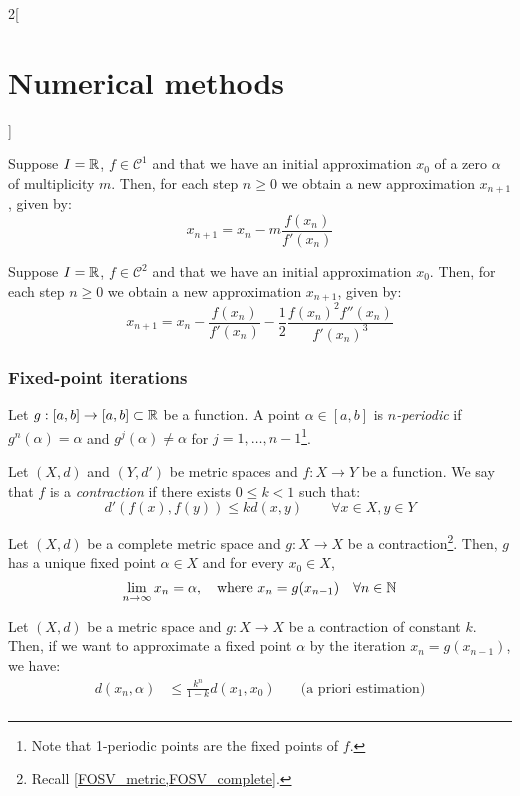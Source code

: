 \documentclass[../../../main_math.tex]{subfiles}
\begin{document}
\begin{multicols}{2}[\section{Numerical methods}]
\begin{method}
  \end{method}
  \begin{method}
    Suppose $I=\mathbb{R}$, $f\in\mathcal{C}^1$ and that we have an initial approximation $x_0$ of a zero $\alpha$ of multiplicity $m$. Then, for each step $n\geq 0$ we obtain a new approximation $x_{n+1}$, given by: $$x_{n+1}=x_n-m\frac{f(x_n)}{f'(x_n)}$$
  \end{method}
  \begin{method}
    Suppose $I=\mathbb{R}$, $f\in\mathcal{C}^2$ and that we have an initial approximation $x_0$. Then, for each step $n\geq 0$ we obtain a new approximation $x_{n+1}$, given by: $$x_{n+1}=x_n-\frac{f(x_n)}{f'(x_n)}-\frac{1}{2}\frac{{f(x_n)}^2f''(x_n)}{{f'(x_n)}^3}$$
  \end{method}
  \subsubsection{Fixed-point iterations}
  \begin{definition}
    Let $g:[a,b]\rightarrow[a,b]\subset\mathbb{R}$ be a function. A point $\alpha\in[a,b]$ is \emph{$n$-periodic} if $g^n(\alpha)=\alpha$ and $g^j(\alpha)\ne\alpha$ for $j=1,\ldots,n-1$\footnote{Note that 1-periodic points are the fixed points of $f$.}.
  \end{definition}
  \begin{definition}
    Let $(X,d)$ and $(Y,d')$  be metric spaces and $f:X\rightarrow Y$ be a function. We say that $f$ is a \emph{contraction} if there exists $0\leq k<1$ such that: $$d'(f(x),f(y))\leq kd(x,y)\qquad\forall x\in X,y\in Y$$
  \end{definition}
  \begin{theorem}
    Let $(X,d)$ be a complete metric space and $g:X\rightarrow X$ be a contraction\footnote{Recall \cref{FOSV_metric,FOSV_complete}.}. Then, $g$ has a unique fixed point $\alpha\in X$ and for every $x_0\in X$, $$\lim_{n\to\infty}x_n=\alpha,\quad\text{where }x_n=g(x_{n-1})\quad\forall n\in\mathbb{N}$$
  \end{theorem}
  \begin{proposition}
    Let $(X,d)$ be a metric space and $g:X\rightarrow X$ be a contraction of constant $k$. Then, if we want to approximate a fixed point $\alpha$ by the iteration $x_n=g(x_{n-1})$, we have:
    \begin{align*}
      d(x_n,\alpha) & \leq\frac{k^n}{1-k}d(x_1,x_0)\quad   & \text{(a priori estimation)}     \\

\end{align*}
\end{proposition}
\end{multicols}
\end{document}

